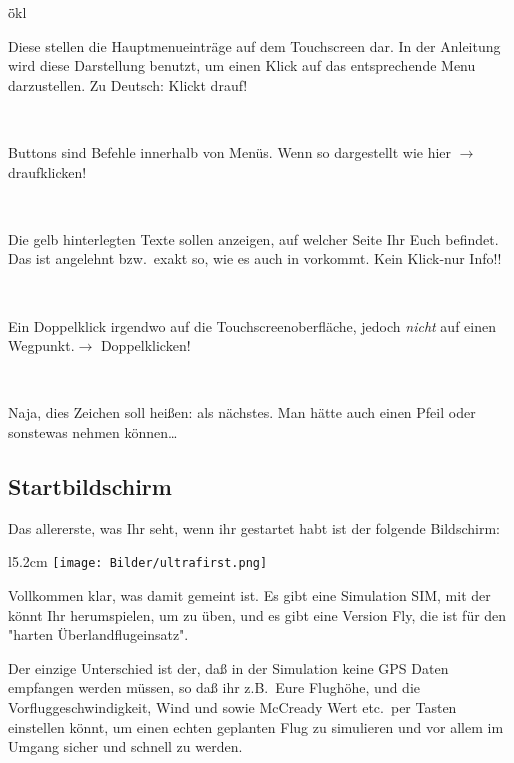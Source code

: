 \begin{tabbing}
\quad\=ökl\hfill \kill
{} \> \parbox[c]{11,4cm}{Diese stellen die Hauptmenueinträge auf dem Touchscreen dar. In der Anleitung wird diese Darstellung benutzt, um einen Klick auf das
entsprechende Menu darzustellen. Zu Deutsch: Klickt drauf!}\\[1.2em]
           \>\parbox[c]{11,4cm}{Buttons sind Befehle innerhalb von Menüs.
Wenn so dargestellt wie  hier $\rightarrow$ draufklicken!}\\[1.2em]
  \>\parbox[c]{11,4cm}{Die gelb hinterlegten Texte sollen anzeigen, auf welcher Seite  Ihr Euch befindet. Das ist angelehnt bzw.\ exakt so, wie es auch in  \xc vorkommt. Kein Klick-nur Info!!}\\[1.2em]
\dklick                           \>\parbox[c]{11,4cm}{Ein Doppelklick irgendwo auf die Touchscreenoberfläche, jedoch \textsl{nicht} auf einen Wegpunkt.$\rightarrow$ Doppelklicken!}\\[1.2em]
\qquad\qquad \blink      \>\parbox[c]{11,4cm}{Naja, dies Zeichen soll heißen: als nächstes. Man hätte auch einen Pfeil oder sonstewas nehmen können\dots}
\end{tabbing}
\subsection{Startbildschirm}
Das allererste, was Ihr seht, wenn ihr \xc gestartet habt ist der folgende Bildschirm:

\begin{wrapfigure}{l}{5.2cm}
\texttt{[image: Bilder/ultrafirst.png]}
\end{wrapfigure}

Vollkommen klar, was damit gemeint ist. Es gibt eine Simulation \textsf{SIM}, mit der könnt Ihr herumspielen, um zu üben, und es gibt eine Version \textsf{Fly}, die ist für den "harten Überlandflugeinsatz".

Der einzige Unterschied ist der, daß in der Simulation keine GPS Daten empfangen werden müssen, so daß ihr z.B.\ Eure Flughöhe, und die Vorfluggeschwindigkeit, Wind und sowie McCready Wert etc.\ per Tasten einstellen könnt, um einen echten geplanten Flug zu simulieren und vor allem im Umgang sicher und schnell zu werden.

